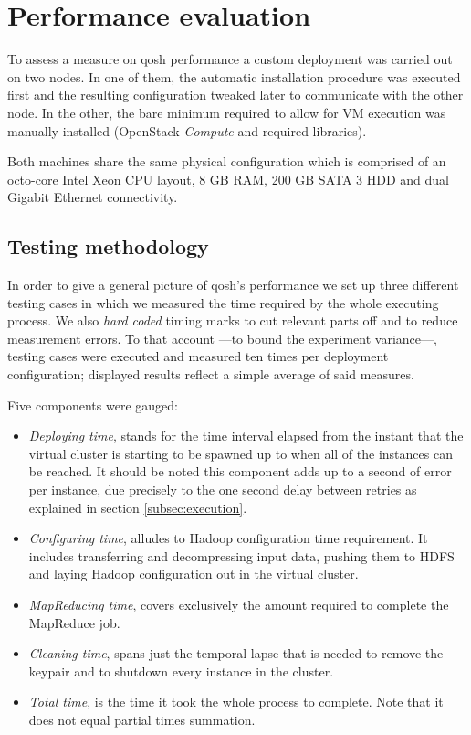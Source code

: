 \documentclass[conference]{IEEEtran}
\begin{document}
\section{Performance evaluation}\label{sec:performance}
\noindent To assess a measure on qosh performance a custom deployment was carried out on two nodes. In one of them, the automatic installation procedure was executed first and the resulting configuration tweaked later to communicate with the other node. In the other, the bare minimum required to allow for VM execution was manually installed (OpenStack \emph{Compute} and required libraries).

Both machines share the same physical configuration which is comprised of an octo-core Intel Xeon CPU layout, 8 GB RAM, 200 GB SATA 3 HDD and dual Gigabit Ethernet connectivity.

\subsection{Testing methodology}\label{subsec:methodology}
\noindent In order to give a general picture of qosh's performance we set up three different testing cases in which we measured the time required by the whole executing process. We also \emph{hard coded} timing marks to cut relevant parts off and to reduce measurement errors. To that account ---to bound the experiment variance---, testing cases were executed and measured ten times per deployment configuration; displayed results reflect a simple average of said measures.

Five components were gauged:
\begin{itemize}
 \item \emph{Deploying time}, stands for the time interval elapsed from the instant that the virtual cluster is starting to be spawned up to when all of the instances can be reached. It should be noted this component adds up to a second of error per instance, due precisely to the one second delay between retries as explained in section \ref{subsec:execution}.
 \item \emph{Configuring time}, alludes to Hadoop configuration time requirement. It includes transferring and decompressing input data, pushing them to HDFS and laying Hadoop configuration out in the virtual cluster.
 \item \emph{MapReducing time}, covers exclusively the amount required to complete the MapReduce job.
 \item \emph{Cleaning time}, spans just the temporal lapse that is needed to remove the keypair and to shutdown every instance in the cluster.
 \item \emph{Total time}, is the time it took the whole process to complete. Note that it does not equal partial times summation.
\end{itemize}
\end{document}
